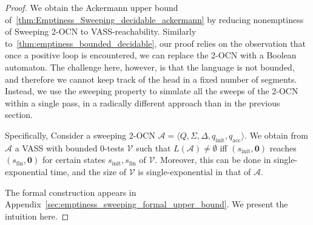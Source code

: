 \documentclass[USenglish]{lipics-v2021}
\newcommand{\tup}[1]{\langle #1 \rangle}
\newcommand{\initstate}{q_{\mathrm{init}}}
\newcommand{\accstate}{q_{\mathrm{acc}}}
\renewcommand{\vec}[1]{\boldsymbol{#1}}
\newcommand{\cA}{\mathcal{A}}
\newcommand{\cV}{\mathcal{V}}
\begin{document}
\begin{proof}
	We obtain the Ackermann upper bound
	of~\cref{thm:Emptiness_Sweeping_decidable_ackermann} by reducing nonemptiness of
	Sweeping 2-OCN to VASS-reachability. Similarly
	to~\cref{thm:emptiness_bounded_decidable}, our proof relies on the observation
	that once a positive loop is encountered, we can replace the 2-OCN with a
	Boolean automaton. The challenge here, however, is that the language
	is not bounded, and therefore we cannot keep track of the head in a fixed number
	of segments. Instead, we use the sweeping property to simulate all the sweeps of
	the 2-OCN within a single pass, in a radically different approach than in the
	previous section.
	
	Specifically, 
	Consider a sweeping 2-OCN $\cA=\tup{Q,\Sigma,\Delta,\initstate,\accstate}$. We obtain from $\cA$ a VASS with bounded 0-tests $\cV$ such that $L(\cA)\neq \emptyset$ iff
	$(s_{\mathrm{init}},\vec{0})$ reaches $(s_{\mathrm{fin}},\vec{0})$ for
	certain states $s_{\mathrm{init}},s_{\mathrm{fin}}$ of $\cV$. Moreover, this
	can be done in single-exponential time, and the size of $\cV$ is single-exponential
	in that of $\cA$.
	
	
	The formal construction appears in Appendix~\ref{sec:emptiness_sweeping_formal_upper_bound}. We present the intuition here.

\end{proof}
\end{document}
